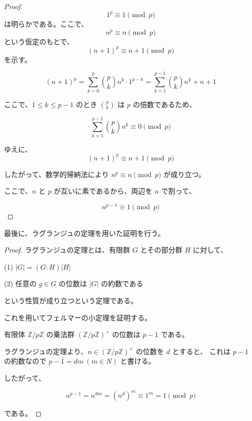 \begin{proof}

\[
1^p \equiv 1 \pmod{p}
\]
は明らかである。ここで、
\[
n^p \equiv n \pmod{p}
\]
という仮定のもとで、
\[
(n+1)^p \equiv n+1 \pmod{p}
\]
を示す。

\[
(n+1)^p = \sum_{k=0}^p \binom{p}{k} n^k \cdot 1^{p-k} = \sum_{k=1}^{p-1} \binom{p}{k} n^k + n + 1
\]

ここで、$1 \leq k \leq p-1$ のとき $\binom{p}{k}$ は $p$ の倍数であるため、

\[
\sum_{k=1}^{p-1} \binom{p}{k} n^k \equiv 0 \pmod{p}
\]

ゆえに、
\[
(n+1)^p \equiv n + 1 \pmod{p}
\]

したがって、数学的帰納法により $n^p \equiv n \pmod{p}$ が成り立つ。

ここで、$n$ と $p$ が互いに素であるから、両辺を $n$ で割って、

\[
n^{p-1} \equiv 1 \pmod{p}
\]

\end{proof}
\begin{theorem}
最後に、ラグランジュの定理を用いた証明を行う。
\end{theorem}

\begin{proof}

ラグランジュの定理とは、有限群 $G$ とその部分群 $H$ に対して、

(1) $|G| = (G : H)|H|$

(2) 任意の $g \in G$ の位数は $|G|$ の約数である

という性質が成り立つという定理である。

これを用いてフェルマーの小定理を証明する。

有限体 $\mathbb{Z}/p\mathbb{Z}$ の乗法群 $(\mathbb{Z}/p\mathbb{Z})^{\times}$ の位数は $p - 1$ である。

ラグランジュの定理より、$n \in (\mathbb{Z}/p\mathbb{Z})^{\times}$ の位数を $d$ とすると、
これは $p - 1$ の約数なので $p - 1 = dm\ (m \in {N})$ と書ける。

したがって、

\[
n^{p-1} = n^{dm} = (n^d)^m \equiv 1^m = 1 \pmod{p}
\]

である。
\end{proof}